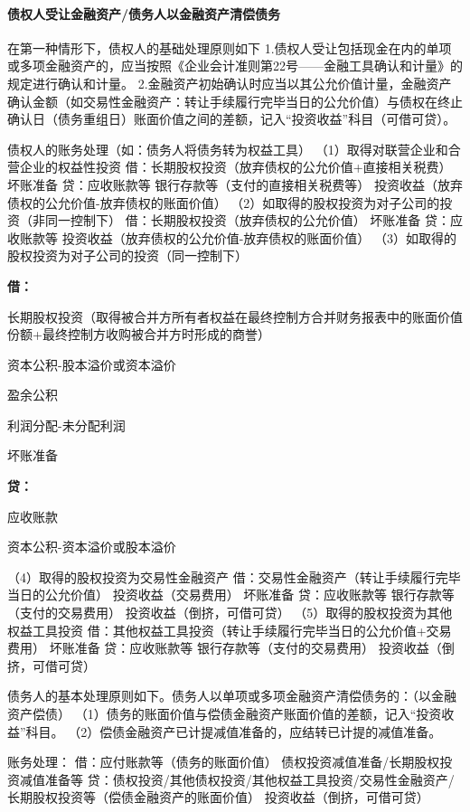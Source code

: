 \documentclass[UTF8,12pt]{ctexart}
\newenvironment{Dr}{%
	\begin{list}{}%
		{
			\setlength{\leftmargin}{2em}
			\setlength{\labelwidth}{2em}
			\setlength{\labelsep}{0pt}
			\setlength{\itemindent}{0pt}
			\setlength{\listparindent}{0pt}
			\setlength{\parsep}{0pt}
			\setlength{\topsep}{0pt}
		}
		\item[\textbf{借：}]
	}{%
	\end{list}
}
\newenvironment{Cr}{%
	\begin{list}{}%
		{
			\setlength{\leftmargin}{2em}
			\setlength{\labelwidth}{2em}
			\setlength{\labelsep}{0pt}
			\setlength{\itemindent}{0pt}
			\setlength{\listparindent}{0pt}
			\setlength{\parsep}{0pt}
			\setlength{\topsep}{0pt}
		}
		\item[\textbf{贷：}]
	}{%
	\end{list}
}
\numberwithin{equation}{section} %
\numberwithin{figure}{section}
\numberwithin{table}{section}
\begin{document}
	\paragraph{债权人受让金融资产/债务人以金融资产清偿债务}在第一种情形下，债权人的基础处理原则如下
	1.债权人受让包括现金在内的单项或多项金融资产的，应当按照《企业会计准则第22号——金融工具确认和计量》的规定进行确认和计量。
	2.金融资产初始确认时应当以其公允价值计量，金融资产确认金额（如交易性金融资产：转让手续履行完毕当日的公允价值）与债权在终止确认日（债务重组日）账面价值之间的差额，记入“投资收益”科目（可借可贷）。
	
	债权人的账务处理（如：债务人将债务转为权益工具）
	（1）取得对联营企业和合营企业的权益性投资
	借：长期股权投资（放弃债权的公允价值+直接相关税费）
	坏账准备
	贷：应收账款等
	银行存款等（支付的直接相关税费等）
	投资收益（放弃债权的公允价值-放弃债权的账面价值）
	（2）如取得的股权投资为对子公司的投资（非同一控制下）
	借：长期股权投资（放弃债权的公允价值）
	坏账准备
	贷：应收账款等
	投资收益（放弃债权的公允价值-放弃债权的账面价值）
	（3）如取得的股权投资为对子公司的投资（同一控制下）
	\begin{Dr}
		长期股权投资（取得被合并方所有者权益在最终控制方合并财务报表中的账面价值份额+最终控制方收购被合并方时形成的商誉）
		
		资本公积-股本溢价或资本溢价
		
		盈余公积
		
		利润分配-未分配利润
		
		坏账准备
	\end{Dr}
	\begin{Cr}
		应收账款
		
		资本公积-资本溢价或股本溢价
	\end{Cr}
	（4）取得的股权投资为交易性金融资产
	借：交易性金融资产（转让手续履行完毕当日的公允价值）
	投资收益（交易费用）
	坏账准备
	贷：应收账款等
	银行存款等（支付的交易费用）
	投资收益（倒挤，可借可贷）
	（5）取得的股权投资为其他权益工具投资
	借：其他权益工具投资（转让手续履行完毕当日的公允价值+交易费用）
	坏账准备
	贷：应收账款等
	银行存款等（支付的交易费用）
	投资收益（倒挤，可借可贷）
	
	债务人的基本处理原则如下。债务人以单项或多项金融资产清偿债务的：（以金融资产偿债）
	（1）债务的账面价值与偿债金融资产账面价值的差额，记入“投资收益”科目。
	（2）偿债金融资产已计提减值准备的，应结转已计提的减值准备。
	
	账务处理：
	借：应付账款等（债务的账面价值）
	债权投资减值准备/长期股权投资减值准备等
	贷：债权投资/其他债权投资/其他权益工具投资/交易性金融资产/长期股权投资等（偿债金融资产的账面价值）
	投资收益（倒挤，可借可贷）
	
\end{document}
